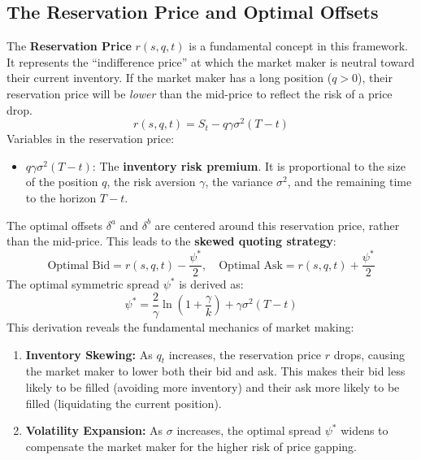 \subsection{The Reservation Price and Optimal Offsets}
The \textbf{Reservation Price} $r(s, q, t)$ is a fundamental concept in this framework. It represents the ``indifference price'' at which the market maker is neutral toward their current inventory. If the market maker has a long position ($q > 0$), their reservation price will be \textit{lower} than the mid-price to reflect the risk of a price drop.
\begin{equation}
    r(s, q, t) = S_t - q \gamma \sigma^2 (T - t)
\end{equation}
Variables in the reservation price:
\begin{itemize}
    \item $q \gamma \sigma^2 (T - t)$: The \textbf{inventory risk premium}. It is proportional to the size of the position $q$, the risk aversion $\gamma$, the variance $\sigma^2$, and the remaining time to the horizon $T-t$.
\end{itemize}

The optimal offsets $\delta^a$ and $\delta^b$ are centered around this reservation price, rather than the mid-price. This leads to the \textbf{skewed quoting strategy}:
\begin{equation}
    \text{Optimal Bid} = r(s, q, t) - \frac{\psi^*}{2}, \quad \text{Optimal Ask} = r(s, q, t) + \frac{\psi^*}{2}
\end{equation}
The optimal symmetric spread $\psi^*$ is derived as:
\begin{equation}
    \psi^* = \frac{2}{\gamma} \ln \left( 1 + \frac{\gamma}{k} \right) + \gamma \sigma^2 (T - t)
\end{equation}
This derivation reveals the fundamental mechanics of market making:
\begin{enumerate}
    \item \textbf{Inventory Skewing:} As $q_t$ increases, the reservation price $r$ drops, causing the market maker to lower both their bid and ask. This makes their bid less likely to be filled (avoiding more inventory) and their ask more likely to be filled (liquidating the current position).
    \item \textbf{Volatility Expansion:} As $\sigma$ increases, the optimal spread $\psi^*$ widens to compensate the market maker for the higher risk of price gapping.
\end{enumerate}


